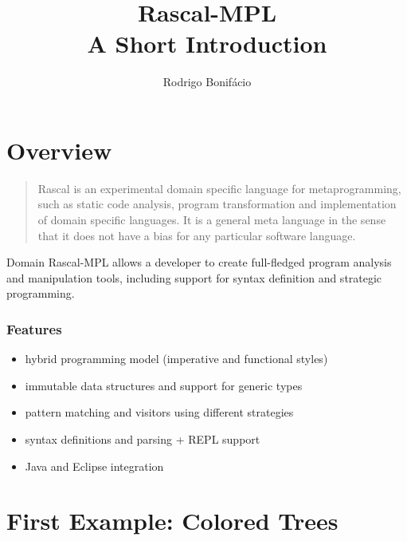 \documentclass{beamer}
\title{Rascal-MPL \\ A Short Introduction}
\author{Rodrigo Bonif\'{a}cio}
\begin{document}
\begin{frame}
\titlepage
\end{frame}

\section{Overview}

\begin{frame}
  \begin{quote}
Rascal is an experimental domain specific language for metaprogramming, such as static code analysis, program transformation and implementation of domain specific languages. It is a general meta language in the sense that it does not have a bias for any particular software language.
  \end{quote}
\end{frame}

\begin{frame}
  \begin{block}{Domain}
    Rascal-MPL allows a developer
    to create full-fledged program
    analysis and manipulation tools,
    including support for syntax
    definition and strategic programming. 
  \end{block}
\end{frame}

\begin{frame}
  \frametitle{Features}

  \begin{itemize}
    \item hybrid programming model (imperative and functional styles)
    \item immutable data structures and support for generic types
    \item pattern matching and visitors using different strategies
    \item syntax definitions and parsing + REPL support  
    \item Java and Eclipse integration  
  \end{itemize}  
\end{frame}

\section{First Example: Colored Trees}

\end{document}
